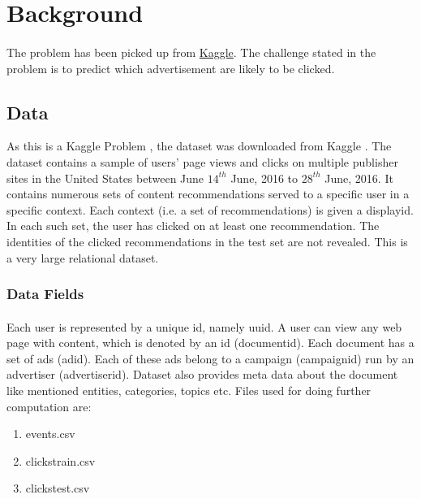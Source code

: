 \documentclass[fleqn,10pt]{SelfArx} %
\begin{document}
\section{Background}
\paragraph{} The problem has been picked up from \href{https://www.kaggle.com}{Kaggle}. The challenge stated in the problem is to predict which advertisement are likely to be clicked. 

\subsection{Data}
As this is a Kaggle Problem \cite{REF:6}, the dataset was downloaded from Kaggle \cite{REF:7}. The dataset contains a sample of users' page views and clicks on multiple publisher sites in the United States between June ${14^{th}}$ June, 2016 to ${28^{th}}$ June, 2016. It contains numerous sets of content recommendations served to a specific user in a specific context. Each context (i.e. a set of recommendations) is given a display\textunderscore id. In each such set, the user has clicked on at least one recommendation. The identities of the clicked recommendations in the test set are not revealed. This is a very large relational dataset. 

\subsubsection{Data Fields}
\paragraph{} Each user is represented by a unique id, namely uuid. A user can view any web page with content, which is denoted by an id (document\textunderscore id). Each document has a set of ads (ad\textunderscore id). Each of these ads belong to a campaign (campaign\textunderscore id) run by an advertiser (advertiser\textunderscore id). Dataset also provides meta data about the document like mentioned entities, categories, topics etc.  
Files used for doing further computation are: 
\begin{enumerate}[noitemsep] %
\item events.csv
\item clicks\textunderscore train.csv
\item clicks\textunderscore test.csv
\end{enumerate}
\end{document}
